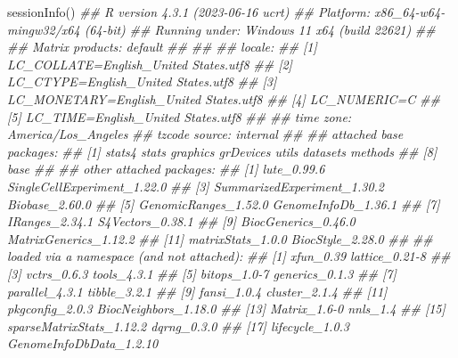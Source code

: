 \documentclass[]{article}
\newcommand{\hlcom}[1]{\textcolor[rgb]{0.502,0.502,0.502}{\textit{#1}}}%
\newcommand{\hlstd}[1]{\textcolor[rgb]{0.251,0.251,0.251}{#1}}%
\newenvironment{Shaded}{\begin{myshaded}}{\end{myshaded}}
\newcommand{\DocumentationTok}[1]{\hlcom{#1}}
\newcommand{\FunctionTok}[1]{\hlstd{#1}}
\newcommand{\NormalTok}[1]{\hlstd{#1}}
\begin{document}
\begin{Shaded}
\begin{Highlighting}[]
\FunctionTok{sessionInfo}\NormalTok{()}
\DocumentationTok{\#\# R version 4.3.1 (2023{-}06{-}16 ucrt)}
\DocumentationTok{\#\# Platform: x86\_64{-}w64{-}mingw32/x64 (64{-}bit)}
\DocumentationTok{\#\# Running under: Windows 11 x64 (build 22621)}
\DocumentationTok{\#\# }
\DocumentationTok{\#\# Matrix products: default}
\DocumentationTok{\#\# }
\DocumentationTok{\#\# }
\DocumentationTok{\#\# locale:}
\DocumentationTok{\#\# [1] LC\_COLLATE=English\_United States.utf8 }
\DocumentationTok{\#\# [2] LC\_CTYPE=English\_United States.utf8   }
\DocumentationTok{\#\# [3] LC\_MONETARY=English\_United States.utf8}
\DocumentationTok{\#\# [4] LC\_NUMERIC=C                          }
\DocumentationTok{\#\# [5] LC\_TIME=English\_United States.utf8    }
\DocumentationTok{\#\# }
\DocumentationTok{\#\# time zone: America/Los\_Angeles}
\DocumentationTok{\#\# tzcode source: internal}
\DocumentationTok{\#\# }
\DocumentationTok{\#\# attached base packages:}
\DocumentationTok{\#\# [1] stats4    stats     graphics  grDevices utils     datasets  methods  }
\DocumentationTok{\#\# [8] base     }
\DocumentationTok{\#\# }
\DocumentationTok{\#\# other attached packages:}
\DocumentationTok{\#\#  [1] lute\_0.99.6                 SingleCellExperiment\_1.22.0}
\DocumentationTok{\#\#  [3] SummarizedExperiment\_1.30.2 Biobase\_2.60.0             }
\DocumentationTok{\#\#  [5] GenomicRanges\_1.52.0        GenomeInfoDb\_1.36.1        }
\DocumentationTok{\#\#  [7] IRanges\_2.34.1              S4Vectors\_0.38.1           }
\DocumentationTok{\#\#  [9] BiocGenerics\_0.46.0         MatrixGenerics\_1.12.2      }
\DocumentationTok{\#\# [11] matrixStats\_1.0.0           BiocStyle\_2.28.0           }
\DocumentationTok{\#\# }
\DocumentationTok{\#\# loaded via a namespace (and not attached):}
\DocumentationTok{\#\#  [1] xfun\_0.39                 lattice\_0.21{-}8           }
\DocumentationTok{\#\#  [3] vctrs\_0.6.3               tools\_4.3.1              }
\DocumentationTok{\#\#  [5] bitops\_1.0{-}7              generics\_0.1.3           }
\DocumentationTok{\#\#  [7] parallel\_4.3.1            tibble\_3.2.1             }
\DocumentationTok{\#\#  [9] fansi\_1.0.4               cluster\_2.1.4            }
\DocumentationTok{\#\# [11] pkgconfig\_2.0.3           BiocNeighbors\_1.18.0     }
\DocumentationTok{\#\# [13] Matrix\_1.6{-}0              nnls\_1.4                 }
\DocumentationTok{\#\# [15] sparseMatrixStats\_1.12.2  dqrng\_0.3.0              }
\DocumentationTok{\#\# [17] lifecycle\_1.0.3           GenomeInfoDbData\_1.2.10  }

\end{Highlighting}
\end{Shaded}
\end{document}

